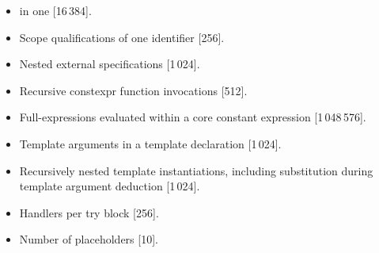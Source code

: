 \begin{itemize}
\item%
 in one  [16\,384].
\item%
Scope qualifications of one identifier [256].
\item%
Nested external specifications [1\,024].
\item%
Recursive constexpr function invocations [512].
\item%
Full-expressions evaluated within a core constant expression [1\,048\,576].
\item%
Template arguments in a template declaration [1\,024].
\item%
Recursively nested template instantiations, including substitution
during template argument deduction [1\,024].
\item%
Handlers per try block [256].
\item%
Number of placeholders [10].

\end{itemize}
